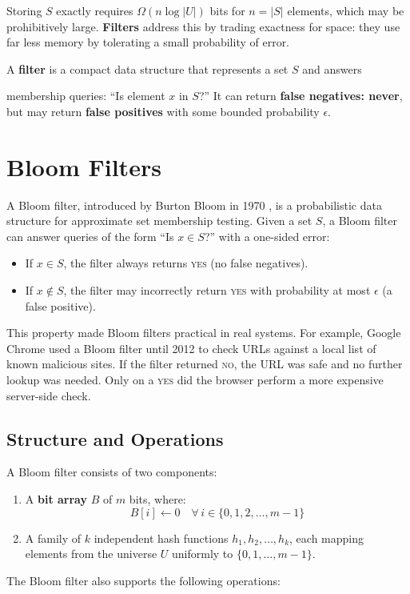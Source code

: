 Storing $S$ exactly requires $\Omega(n \log |U|)$ bits for $n = |S|$ elements, 
which may be prohibitively large. \textbf{Filters} address this by trading 
exactness for space: they use far less memory by tolerating a small 
probability of error.

\begin{definitionbox}
A \textbf{filter} is a compact data structure that represents a set $S$ and answers

membership queries: ``Is element $x$ in $S$?'' It can return \textbf{false negatives: never},
but may return \textbf{false positives} with some bounded probability $\epsilon$.
\end{definitionbox}


\section{Bloom Filters}

A Bloom filter, introduced by Burton Bloom in 1970 \cite{bloom}, is a 
probabilistic data structure for approximate set membership testing. Given 
a set $S$, a Bloom filter can answer queries of the form ``Is $x \in S$?'' 
with a one-sided error:

\begin{itemize}
  \item If $x \in S$, the filter always returns \textsc{yes} (no false negatives).
  \item If $x \notin S$, the filter may incorrectly return \textsc{yes} with 
        probability at most $\epsilon$ (a false positive).
\end{itemize}

This property made Bloom filters practical in real systems. For example, 
Google Chrome \cite{chrome-bloom} used a Bloom filter until 2012 to check URLs against a local 
list of known malicious sites. If the filter returned \textsc{no}, the URL 
was safe and no further lookup was needed. Only on a \textsc{yes} did the 
browser perform a more expensive server-side check.

\subsection{Structure and Operations}

A Bloom filter consists of two components:
\begin{enumerate}
  \item A \textbf{bit array} $B$ of $m$ bits, where:
  \[
  B[i] \leftarrow 0 \quad \forall \, i \in \{0, 1, 2, \dots, m-1\}
\]

  \item A family of $k$ independent hash functions $h_1, h_2, \dots, h_k$, 
        each mapping elements from the universe $U$ uniformly to 
        $\{0, 1, \dots, m-1\}$.
\end{enumerate}
The Bloom filter also supports the following operations:

